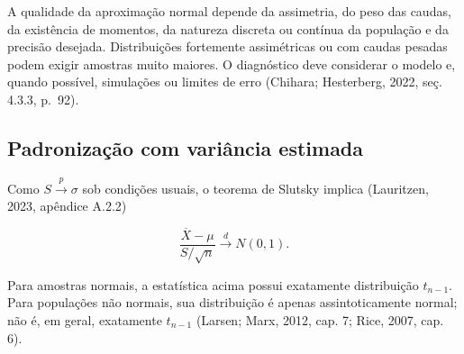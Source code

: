 \documentclass[
  letterpaper,
  DIV=11,
  numbers=noendperiod]{scrreprt}
\begin{document}
\begin{tcolorbox}[enhanced jigsaw, colback=white, leftrule=.75mm, colbacktitle=quarto-callout-warning-color!10!white, breakable, titlerule=0mm, bottomtitle=1mm, title=\textcolor{quarto-callout-warning-color}{\faExclamationTriangle}\hspace{0.5em}{Observação --- Não existe uma regra universal \(n\geq30\)}, colframe=quarto-callout-warning-color-frame, toprule=.15mm, opacityback=0, bottomrule=.15mm, opacitybacktitle=0.6, arc=.35mm, toptitle=1mm, rightrule=.15mm, coltitle=black, left=2mm]

A qualidade da aproximação normal depende da assimetria, do peso das
caudas, da existência de momentos, da natureza discreta ou contínua da
população e da precisão desejada. Distribuições fortemente assimétricas
ou com caudas pesadas podem exigir amostras muito maiores. O diagnóstico
deve considerar o modelo e, quando possível, simulações ou limites de
erro (Chihara; Hesterberg, 2022, seç. 4.3.3, p.~92).

\end{tcolorbox}

\subsection{Padronização com variância
estimada}\label{padronizauxe7uxe3o-com-variuxe2ncia-estimada}

Como \(S\xrightarrow{p}\sigma\) sob condições usuais, o teorema de
Slutsky implica (Lauritzen, 2023, apêndice A.2.2)

\[\frac{\overline{X}-\mu}{S/\sqrt{n}}
\xrightarrow{d}N(0,1).\]

\begin{tcolorbox}[enhanced jigsaw, colback=white, leftrule=.75mm, colbacktitle=quarto-callout-warning-color!10!white, breakable, titlerule=0mm, bottomtitle=1mm, title=\textcolor{quarto-callout-warning-color}{\faExclamationTriangle}\hspace{0.5em}{Observação --- Resultado exato e resultado assintótico}, colframe=quarto-callout-warning-color-frame, toprule=.15mm, opacityback=0, bottomrule=.15mm, opacitybacktitle=0.6, arc=.35mm, toptitle=1mm, rightrule=.15mm, coltitle=black, left=2mm]

Para amostras normais, a estatística acima possui exatamente
distribuição \(t_{n-1}\). Para populações não normais, sua distribuição
é apenas assintoticamente normal; não é, em geral, exatamente
\(t_{n-1}\) (Larsen; Marx, 2012, cap. 7; Rice, 2007, cap. 6).

\end{tcolorbox}
\end{document}
